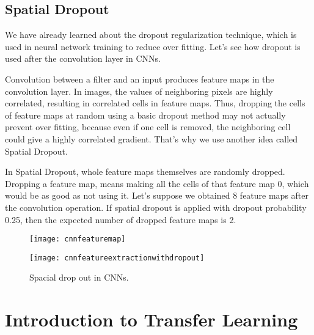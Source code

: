 	\subsection{Spatial Dropout}
	\begin{bulletedlist}
		\item We have already learned about the dropout regularization technique, which is used in neural network training to reduce over fitting.  Let's see how dropout is used after the convolution layer in CNNs.
		\item Convolution between a filter and an input produces feature maps in the convolution layer.  In images, the values of neighboring pixels are highly correlated, resulting in correlated cells in feature maps.  Thus, dropping the cells of feature maps at random using a basic dropout method may not actually prevent over fitting, because even if one cell is removed, the neighboring cell
could give a highly correlated gradient.  That's why we use another idea called Spatial Dropout.
		\item In Spatial Dropout, whole feature maps themselves are randomly dropped.  Dropping a feature map, means making all the cells of that feature map 0, which would be as good as not using it.  Let's suppose we obtained 8 feature maps after the convolution operation. If spatial dropout is applied with dropout probability 0.25, then the expected number of dropped feature maps is 2.
	\end{bulletedlist}

	\begin{figure}[tbh]
		\centering
		\begin{minipage}{\textwidth}
		\centering
		\texttt{[image: cnnfeaturemap]}
		\end{minipage}
		\begin{minipage}{\textwidth}
		\centering
		\texttt{[image: cnnfeatureextractionwithdropout]}
		\end{minipage}
		\caption[Spacial drop out in CNNs]{Spacial drop out in CNNs.}
		\label{fig:cnnfeaturemap}
	\end{figure}

	\section{Introduction to Transfer Learning}
